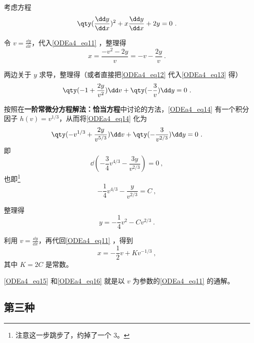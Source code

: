 \begin{example}{}
考虑方程
\begin{equation}\label{ODEa4_eq11}
\qty(\frac{\dd y}{\dd x})^2+x\frac{\dd y}{\dd x}+2y=0~.
\end{equation}

令 $v=\frac{\dd y}{\dd x}$，代入\autoref{ODEa4_eq11} ，整理得
\begin{equation}\label{ODEa4_eq12}
x=\frac{-v^2-2y}{v}=-v-\frac{2y}{v}~.
\end{equation}



两边关于 $y$ 求导，整理得（或者直接把\autoref{ODEa4_eq12} 代入\autoref{ODEa4_eq13} 得）
\begin{equation}\label{ODEa4_eq14}
\qty(-1+\frac{2y}{v^2})\dd v+\qty(-\frac{3}{v})\dd y=0~.
\end{equation}

按照在\textbf{一阶常微分方程解法：恰当方程}中讨论的方法，\autoref{ODEa4_eq14} 有一个积分因子 $h(v)=v^{1/3}$，从而将\autoref{ODEa4_eq14} 化为
\begin{equation}
\qty(-v^{1/3}+\frac{2y}{v^{5/3}})\dd v+\qty(-\frac{3}{v^{2/3}})\dd y=0~.
\end{equation}
即
\begin{equation}
\dd (-\frac{3}{4}v^{4/3}-\frac{3y}{v^{2/3}})=0~,
\end{equation}
也即\footnote{注意这一步跳步了，约掉了一个 $3$。}
\begin{equation}
-\frac{1}{4}v^{4/3}-\frac{y}{v^{2/3}}=C~,
\end{equation}

整理得
\begin{equation}\label{ODEa4_eq15}
y=-\frac{1}{4}v^2-Cv^{2/3}~.
\end{equation}

利用 $v=\frac{\dd y}{\dd x}$，再代回\autoref{ODEa4_eq11} ，得到
\begin{equation}\label{ODEa4_eq16}
x=-\frac{1}{2}v+Kv^{-1/3}~,
\end{equation}
其中 $K=2C$ 是常数。

\autoref{ODEa4_eq15} 和\autoref{ODEa4_eq16} 就是以 $v$ 为参数的\autoref{ODEa4_eq11} 的通解。



\end{example}



\subsection{第三种}

